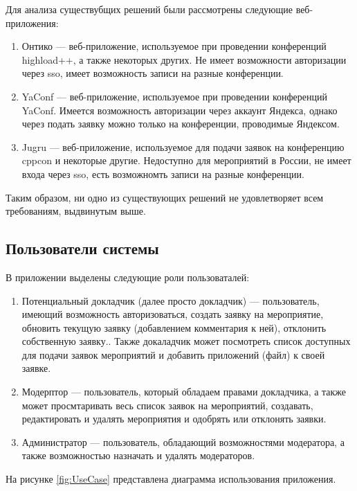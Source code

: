 Для анализа существубщих решений были рассмотрены следующие веб-приложения:
\begin{enumerate}
	\item Онтико --- веб-приложение, используемое при проведении конференций highload++, а также некоторых других. Не имеет возможности авторизации через sso, имеет возможность записи на разные конференции.
	\item YaConf --- веб-приложение, используемое при проведении конференций YaConf. Имеется возможность авторизации через аккаунт Яндекса, однако через подать заявку можно только на конференции, проводимые Яндексом.
	\item Jugru --- веб-приложение, используемое для подачи заявок на конференцию cppcon и некоторые другие. Недоступно для мероприятий в России, не имеет входа через sso, есть возможномть записи на разные конференции.
\end{enumerate}

Таким образом, ни одно из существующих решений не удовлетворяет всем требованиям, выдвинутым выше.

\subsection{Пользователи системы}

В приложении выделены следующие роли пользоваталей:
\begin{enumerate}
	\item Потенциальный докладчик (далее просто докладчик) --- пользователь, имеющий возможность авторизоваться, создать заявку на мероприятие, обновить текущую заявку (добавлением комментария к ней), отклонить собственную заявку.. Также докаладчик может посмотреть список доступных для подачи заявок мероприятий и добавить приложений (файл) к своей заявке.
	\item Модерптор --- пользователь, который обладаем правами докладчика, а также может просмтаривать весь список заявок на мероприятий, создавать, редактировать и удалять мероприятия  и одобрять или отклонять заявки.
	\item Администратор --- пользователь, обладающий возможностями модератора, а также возможностью назначать и удалять модераторов.
\end{enumerate}

На рисунке \ref{fig:UseCase} представлена диаграмма использования приложения.

